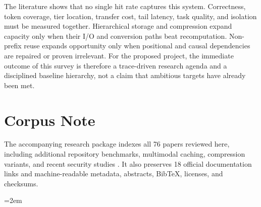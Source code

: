 \documentclass[conference,10pt]{IEEEtran}
\begin{document}
The literature shows that no single hit rate captures this system. Correctness, token coverage, tier location, transfer cost, tail latency, task quality, and isolation must be measured together. Hierarchical storage and compression expand capacity only when their I/O and conversion paths beat recomputation. Non-prefix reuse expands opportunity only when positional and causal dependencies are repaired or proven irrelevant. For the proposed project, the immediate outcome of this survey is therefore a trace-driven research agenda and a disciplined baseline hierarchy, not a claim that ambitious targets have already been met.

\section*{Corpus Note}

The accompanying research package indexes all 76 papers reviewed here, including additional repository benchmarks, multimodal caching, compression variants, and recent security studies \cite{yang2024swebench,zhang2025swebench,zan2025multiswebench,pan2024training,liang2024repofuse,liu2024graphcoder,zhao2025mpic,chen2026packet,wang2025mepic,zhang2026sparsex,sharma2024minikv,duanmu2024skvq,zhang2024pqcache}. It also preserves 18 official documentation links and machine-readable metadata, abstracts, BibTeX, licenses, and checksums.

\begingroup
\sloppy
\emergencystretch=2em
\hfuzz=1pt


\endgroup
\end{document}

